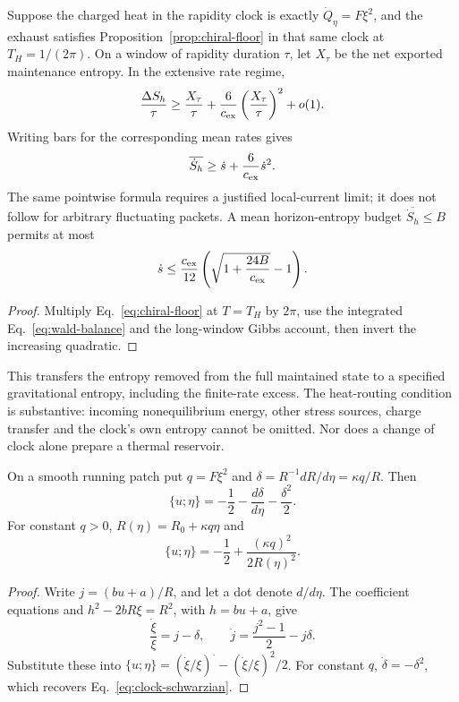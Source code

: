 \begin{proposition}
\label{prop:horizon-floor}
Suppose the charged heat in the rapidity clock is exactly
$\dot Q_\eta=F\xi^2$, and the exhaust satisfies
Proposition~\ref{prop:chiral-floor} in that same clock at $T_H=1/(2\pi)$.
On a window of rapidity duration $\tau$, let $X_\tau$ be the net exported
maintenance entropy. In the extensive rate regime,
\[
 \frac{\Delta S_h}{\tau}\ge\frac{X_\tau}{\tau}
       +\frac{6}{c_{\rm ex}}\left(\frac{X_\tau}{\tau}\right)^2+o(1).
\]
Writing bars for the corresponding mean rates gives
\begin{equation}\label{eq:horizon-floor}
 \overline{\dot S_h}\ge \dot s+\frac{6}{c_{\rm ex}}\dot s^2.
\end{equation}
The same pointwise formula requires a justified local-current limit; it does
not follow for arbitrary fluctuating packets. A mean horizon-entropy budget
$\overline{\dot S_h}\le B$ permits at most
\[
 \dot s\le \frac{c_{\rm ex}}{12}
       \left(\sqrt{1+\frac{24B}{c_{\rm ex}}}-1\right).
\]
\end{proposition}
\begin{proof}
Multiply Eq.~\eqref{eq:chiral-floor} at $T=T_H$ by $2\pi$, use
the integrated Eq.~\eqref{eq:wald-balance} and the long-window Gibbs account,
then invert the increasing quadratic.
\end{proof}

This transfers the entropy removed from the full maintained state to a specified
gravitational entropy, including the finite-rate excess. The heat-routing
condition is substantive: incoming nonequilibrium energy, other stress sources,
charge transfer and the clock's own entropy cannot be omitted. Nor does a change
of clock alone prepare a thermal reservoir.

\begin{proposition}
\label{prop:clock-schwarzian}
On a smooth running patch put $q=F\xi^2$ and
$\delta=R^{-1}dR/d\eta=\kappa q/R$. Then
\begin{equation}\label{eq:clock-general}
 \{u;\eta\}=-\frac12-\frac{d\delta}{d\eta}-\frac{\delta^2}{2}.
\end{equation}
For constant $q>0$, $R(\eta)=R_0+\kappa q\eta$ and
\begin{equation}\label{eq:clock-schwarzian}
 \{u;\eta\}=-\frac12+\frac{(\kappa q)^2}{2R(\eta)^2}.
\end{equation}
\end{proposition}
\begin{proof}
Write $j=(bu+a)/R$, and let a dot denote $d/d\eta$.
The coefficient equations and $h^2-2bR\xi=R^2$, with $h=bu+a$, give
\[
 \frac{\dot\xi}{\xi}=j-\delta,\qquad
 \dot j=\frac{j^2-1}{2}-j\delta.
\]
Substitute these into $\{u;\eta\}=(\dot\xi/\xi)^{\displaystyle\cdot}
-(\dot\xi/\xi)^2/2$. For constant $q$, $\dot\delta=-\delta^2$,
which recovers Eq.~\eqref{eq:clock-schwarzian}.
\end{proof}

